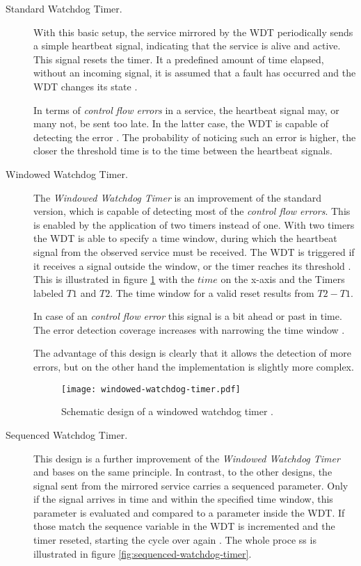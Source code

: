 \begin{description}
\item [Standard Watchdog Timer.]
With this basic setup, the service mirrored by the WDT periodically sends a simple heartbeat signal, indicating that the service is alive and active. This signal resets the timer. It a predefined amount of time elapsed, without an incoming signal, it is assumed that a fault has occurred and the WDT changes its state \cite{elattar2007}.

In terms of \emph{control flow errors} in a service, the heartbeat signal may, or many not, be sent too late. In the latter case, the WDT is capable of detecting the error \cite{elattar2007}. 
The probability of noticing such an error is higher, the closer the threshold time is to the time between the heartbeat signals.

\item [Windowed Watchdog Timer.]
The \emph{Windowed Watchdog Timer} is an improvement of the standard version, which is capable of detecting most of the \emph{control flow errors}. This is enabled by the application of two timers instead of one. With two timers the WDT is able to specify a time window, during which the heartbeat signal from the observed service must be received. The WDT is triggered if it receives a signal outside the window, or the timer reaches its threshold \cite{elattar2007}. This is illustrated in figure \ref{fig:windowed-watchdog-timer} with the $time$ on the x-axis and the Timers labeled $T1$ and $T2$. The time window for a valid reset results from $T2 - T1$.

In case of an \emph{control flow error} this signal is a bit ahead or past in time. The error detection coverage increases with narrowing the time window \cite{elattar2007}.  

The advantage of this design is clearly that it allows the detection of more errors, but on the other hand the implementation is slightly more complex.

\begin{figure}[!htbp]
\centering
\texttt{[image: windowed-watchdog-timer.pdf]}
\caption{Schematic design of a windowed watchdog timer \cite{elattar2007}.}
\label{fig:windowed-watchdog-timer}
\end{figure}

\item [Sequenced Watchdog Timer.] 
This design is a further improvement of the \emph{Windowed Watchdog Timer} and bases on the same principle. In contrast, to the other designs, the signal sent from the mirrored service carries a sequenced parameter. Only if the signal arrives in time and within the specified time window, this parameter is evaluated and compared to a parameter inside the WDT. If those match the sequence variable in the WDT is incremented and the timer reseted, starting the cycle over again \cite{elattar2007}.
The whole proce ss is illustrated in figure \ref{fig:sequenced-watchdog-timer}.


\end{description}

